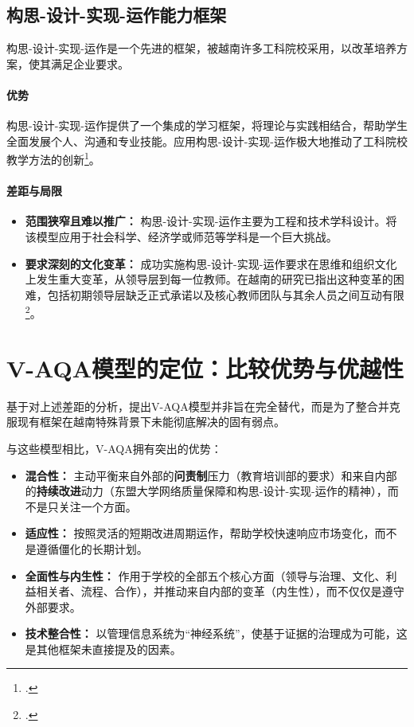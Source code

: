\subsection{构思-设计-实现-运作能力框架}
构思-设计-实现-运作是一个先进的框架，被越南许多工科院校采用，以改革培养方案，使其满足企业要求。

\paragraph{优势} 构思-设计-实现-运作提供了一个集成的学习框架，将理论与实践相结合，帮助学生全面发展个人、沟通和专业技能。应用构思-设计-实现-运作极大地推动了工科院校教学方法的创新\footcite{vietnamplus_cdio_reform}。

\paragraph{差距与局限}
\begin{itemize}
    \item \textbf{范围狭窄且难以推广：} 构思-设计-实现-运作主要为工程和技术学科设计。将该模型应用于社会科学、经济学或师范等学科是一个巨大挑战。
    \item \textbf{要求深刻的文化变革：} 成功实施构思-设计-实现-运作要求在思维和组织文化上发生重大变革，从领导层到每一位教师。在越南的研究已指出这种变革的困难，包括初期领导层缺乏正式承诺以及核心教师团队与其余人员之间互动有限\footcite{nguyen_cdio_2016}。
\end{itemize}

\section{V-AQA模型的定位：比较优势与优越性}
\label{sec:dinh_vi_vqa}

基于对上述差距的分析，提出V-AQA模型并非旨在完全替代，而是为了整合并克服现有框架在越南特殊背景下未能彻底解决的固有弱点。

与这些模型相比，V-AQA拥有突出的优势：
\begin{itemize}
    \item \textbf{混合性：} 主动平衡来自外部的\textbf{问责制}压力（教育培训部的要求）和来自内部的\textbf{持续改进}动力（东盟大学网络质量保障和构思-设计-实现-运作的精神），而不是只关注一个方面。
    \item \textbf{适应性：} 按照灵活的短期改进周期运作，帮助学校快速响应市场变化，而不是遵循僵化的长期计划。
    \item \textbf{全面性与内生性：} 作用于学校的全部五个核心方面（领导与治理、文化、利益相关者、流程、合作），并推动来自内部的变革（内生性），而不仅仅是遵守外部要求。
    \item \textbf{技术整合性：} 以管理信息系统为“神经系统”，使基于证据的治理成为可能，这是其他框架未直接提及的因素。
\end{itemize}

